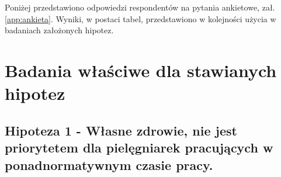 \documentclass[a4paper,12pt,twoside,openright]{mwrep}
\begin{document}
	Poniżej przedstawiono odpowiedzi respondentów na pytania ankietowe, zał. \ref{app:ankieta}. 
	Wyniki, w postaci tabel, przedstawiono w kolejności użycia w badaniach założonych hipotez.
	
\vspace{\baselineskip} 
























































\section*{Badania właściwe dla stawianych hipotez}


\subsection* {Hipoteza 1 - Własne zdrowie, nie jest priorytetem dla pielęgniarek pracujących w ponadnormatywnym czasie pracy.}
\end{document}
